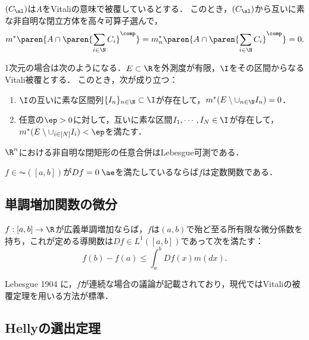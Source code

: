\documentclass[uplatex, dvipdfmx]{jsreport}
\begin{document}
\begin{theorem}[Vitali (1907)]
    $(C_\al)$は$A$をVitaliの意味で被覆しているとする．
    このとき，$(C_\al)$から互いに素な非自明な閉立方体を高々可算子選んで，
    \[m^*\paren{A\cap\paren{\sum_{i\in\N}C_i}^\comp}=m_n^*\paren{A\cap\paren{\sum_{i\in\N}C_i}^\comp}=0.\]
\end{theorem}
\begin{remarks}
    1次元の場合は次のようになる．$E\subset\R$を外測度が有限，$\I$をその区間からなるVitali被覆とする．
    このとき，次が成り立つ：
    \begin{enumerate}
        \item $\I$の互いに素な区間列$\{I_n\}_{n\in\N}\subset\I$が存在して，$m^*(E\setminus\cup_{n\in\N}I_n)=0$．
        \item 任意の$\ep>0$に対して，互いに素な区間$I_1,\cdots,I_N\in\I$が存在して，$m^*(E\setminus\cup_{i\in[N]}I_i)<\ep$を満たす．
    \end{enumerate}
\end{remarks}

\begin{corollary}[閉矩形の任意合併はLebesgue可測]\label{cor-Vitali}
    $\R^n$における非自明な閉矩形の任意合併はLebesgue可測である．
\end{corollary}

\begin{corollary}[定数関数の微分による特徴付け]
    $f\in\AC([a,b])$が$Df=0\;\ae$を満たしているならば$f$は定数関数である．
\end{corollary}

\subsection{単調増加関数の微分}

\begin{theorem}[Lebesgue]\label{thm-Lebesgue-fundamental}
    $f:[a,b]\to\R$が広義単調増加ならば，$f$は$(a,b)$で殆ど至る所有限な微分係数を持ち，これが定める導関数は$Df\in L^1([a,b])$であって次を満たす：
    \[f(b)-f(a)\le\int^b_aDf(x)m(dx).\]
\end{theorem}
\begin{history}
    Lebesgue 1904 \cite{Lebesgue04}に，$f$が連続な場合の議論が記載されており，現代ではVitaliの被覆定理を用いる方法が標準．
\end{history}

\subsection{Hellyの選出定理}
\end{document}
